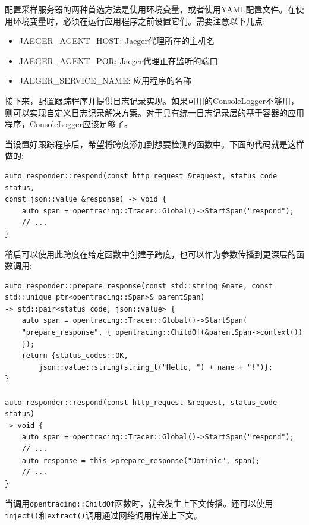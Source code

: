 配置采样服务器的两种首选方法是使用环境变量，或者使用YAML配置文件。在使用环境变量时，必须在运行应用程序之前设置它们。需要注意以下几点:

\begin{itemize}
\item 
JAEGER\_AGENT\_HOST: Jaeger代理所在的主机名

\item 
JAEGER\_AGENT\_POR: Jaeger代理正在监听的端口

\item 
JAEGER\_SERVICE\_NAME: 应用程序的名称
\end{itemize}

接下来，配置跟踪程序并提供日志记录实现。如果可用的ConsoleLogger不够用，则可以实现自定义日志记录解决方案。对于具有统一日志记录层的基于容器的应用程序，ConsoleLogger应该足够了。

当设置好跟踪程序后，希望将跨度添加到想要检测的函数中。下面的代码就是这样做的:

\begin{lstlisting}[style=styleCXX]
auto responder::respond(const http_request &request, status_code status,
const json::value &response) -> void {
	auto span = opentracing::Tracer::Global()->StartSpan("respond");
	// ...
}
\end{lstlisting}

稍后可以使用此跨度在给定函数中创建子跨度，也可以作为参数传播到更深层的函数调用:

\begin{lstlisting}[style=styleCXX]
auto responder::prepare_response(const std::string &name, const
std::unique_ptr<opentracing::Span>& parentSpan)
-> std::pair<status_code, json::value> {
	auto span = opentracing::Tracer::Global()->StartSpan(
	"prepare_response", { opentracing::ChildOf(&parentSpan->context())
	});
	return {status_codes::OK,
		json::value::string(string_t("Hello, ") + name + "!")};
}

auto responder::respond(const http_request &request, status_code status)
-> void {
	auto span = opentracing::Tracer::Global()->StartSpan("respond");
	// ...
	auto response = this->prepare_response("Dominic", span);
	// ...
}
\end{lstlisting}

当调用\texttt{opentracing::ChildOf}函数时，就会发生上下文传播。还可以使用\texttt{inject()}和\texttt{extract()}调用通过网络调用传递上下文。













